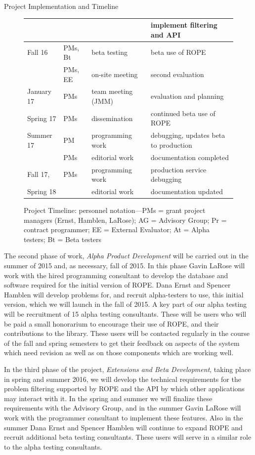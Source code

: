 \documentclass[11pt]{article}
\begin{document}
\begin{section}{Project Implementation and Timeline}
\begin{figure}
\begin{center}
\begin{tabular}{|l|l|l|l|}
	& & & implement filtering and API \\
  \hline
  Fall 16 & PMs, Bt & beta testing & beta use of ROPE \\
	& PMs, EE & on-site meeting & second evaluation \\
  \hline
  January 17 & PMs & team meeting (JMM) & evaluation and planning \\
  \hline
  Spring 17 & PMs & dissemination & continued beta use of ROPE \\
  \hline
  Summer 17 & PM & programming work & debugging, updates beta to
	production \\ 
	& PMs & editorial work & documentation completed \\
  \hline
  Fall 17, & PMs & programming work & production service debugging\\
  Spring 18 & & editorial work & documentation updated \\ 
  \hline
\end{tabular}
\caption{Project Timeline: personnel notation---PMs = grant project
  managers (Ernst, Hamblen, LaRose); AG =
  Advisory Group; Pr = contract programmer; EE = External Evaluator; At =
  Alpha testers; Bt = Beta testers}
\label{timeline}
\end{center}
\end{figure}

The second phase of work, \emph{Alpha Product Development} will be carried
out in the summer of 2015 and, as necessary, fall of 2015.  In this phase
Gavin LaRose will work with the hired programming consultant to develop
the database and software required for the initial version of ROPE.
Dana Ernst and Spencer Hamblen will develop problems for, and recruit
alpha-testers to use, this initial version, which we will launch in the
fall of 2015.  A key part of our alpha testing will be recruitment of 15
alpha testing consultants.  These will be users who will be paid a small
honorarium to encourage their use of ROPE, and their contributions to
the library.  These users will be contacted regularly in the course of the
fall and spring semesters to get their feedback on aspects of the system
which need revision as well as on those components which are working well.

In the third phase of the project, \emph{Extensions and Beta Development},
taking place in spring and summer 2016, we will develop the technical
requirements for the problem filtering supported by ROPE and the API by
which other applications may interact with it.  In the spring and summer
we will finalize these requirements with the Advisory Group, and in the
summer Gavin LaRose will work with the programmer consultant to implement
these features.  Also in the summer Dana Ernst and Spencer Hamblen will
continue to expand ROPE and recruit additional beta testing
consultants.  These users will serve in a similar role to the alpha
testing consultants.


\end{section}
\end{document}
